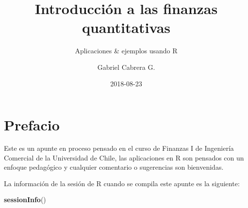 \documentclass[12pt,]{book}
\title{Introducción a las finanzas quantitativas}
\subtitle{Aplicaciones \& ejemplos usando R}
\author{Gabriel Cabrera G.}
\date{2018-08-23}
\newenvironment{Shaded}{\begin{snugshade}}{\end{snugshade}}
\newcommand{\KeywordTok}[1]{\textcolor[rgb]{0.13,0.29,0.53}{\textbf{#1}}}
\newcommand{\NormalTok}[1]{#1}
\begin{document}
\maketitle

{
\hypersetup{linkcolor=black}
\setcounter{tocdepth}{2}
\tableofcontents
}
\listoftables
\listoffigures
\chapter*{Prefacio}\label{prefacio}


Este es un apunte en proceso pensado en el curso de Finanzas I de
Ingeniería Comercial de la Universidad de Chile, las aplicaciones en R
son pensados con un enfoque pedagógico y cualquier comentario o
sugerencias son bienvenidas.

La información de la sesión de R cuando se compila este apunte es la
siguiente:

\begin{Shaded}
\begin{Highlighting}[]
\KeywordTok{sessionInfo}\NormalTok{()}
\end{Highlighting}
\end{Shaded}
\end{document}
